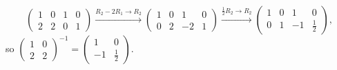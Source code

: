 \begin{example}
\[
\left ( \begin{array}{cc|cc}
1 & 0 & 1 & 0 \\ 2 & 2 & 0 & 1
\end{array} \right )
\xrightarrow{R_2-2R_1\to R_2}
\left ( \begin{array}{cc|cc}
1 & 0 & 1 & 0 \\ 0 & 2 & -2 & 1
\end{array} \right )
\xrightarrow{\frac{1}{2}R_2\to R_2}
\left ( \begin{array}{cc|cc}
1 & 0 & 1 & 0 \\ 0 & 1 & -1 & \tfrac{1}{2}
\end{array} \right ),
\]
so $\left ( \begin{smallmatrix} 1 & 0\\ 2 & 2 \end{smallmatrix} \right )^{-1}
= \left ( \begin{smallmatrix} 1 & 0\\ -1 & \tfrac{1}{2} \end{smallmatrix} \right )$.
\end{example}


